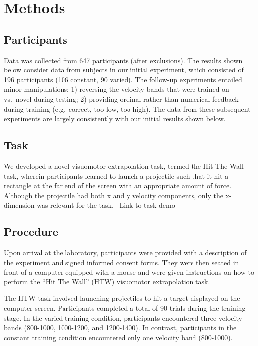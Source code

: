 \documentclass[
  letterpaper,
  DIV=11,
  numbers=noendperiod,
  oneside]{scrartcl}
\begin{document}
\section{Methods}\label{methods}

\subsection{Participants}\label{participants}

Data was collected from 647 participants (after exclusions). The results
shown below consider data from subjects in our initial experiment, which
consisted of 196 participants (106 constant, 90 varied). The follow-up
experiments entailed minor manipulations: 1) reversing the velocity
bands that were trained on vs.~novel during testing; 2) providing
ordinal rather than numerical feedback during training (e.g.~correct,
too low, too high). The data from these subsequent experiments are
largely consistently with our initial results shown below.

\subsection{Task}\label{task}

We developed a novel visuomotor extrapolation task, termed the Hit The
Wall task, wherein participants learned to launch a projectile such that
it hit a rectangle at the far end of the screen with an appropriate
amount of force. Although the projectile had both x and y velocity
components, only the x-dimension was relevant for the task.~
\href{https://pcl.sitehost.iu.edu/tg/HTW/HTW_Index.html?sonaid=}{Link to
task demo}

\subsection{Procedure}\label{procedure}

Upon arrival at the laboratory, participants were provided with a
description of the experiment and signed informed consent forms. They
were then seated in front of a computer equipped with a mouse and were
given instructions on how to perform the ``Hit The Wall'' (HTW)
visuomotor extrapolation task.

The HTW task involved launching projectiles to hit a target displayed on
the computer screen. Participants completed a total of 90 trials during
the training stage. In the varied training condition, participants
encountered three velocity bands (800-1000, 1000-1200, and 1200-1400).
In contrast, participants in the constant training condition encountered
only one velocity band (800-1000).
\end{document}

